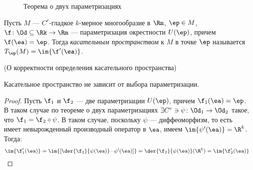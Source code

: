 \begin{figure}[ht]
    \centering
    \caption{Теорема о двух параметризациях}
\end{figure}

\newpage

\begin{definition}

    Пусть $M$ --- $C^r$-гладкое $k$-мерное многообразие в $\Rm$, $\ep \in M$,
    \\ $\f \colon \Od \subseteq \Rk \to \Rm$ --- параметризация окрестности
    $U(\ep)$, причем $\f(\ea) = \ep$. Тогда \textit{касательным
    пространством} к $M$ в точке $\ep$ называется $T_\ep(M) = \im{\f'(\ea)}$.
\end{definition}

\begin{theorem}(О корректности определения касательного пространства)

    Касательное пространство не зависит от выбора параметризации.
\end{theorem}
\begin{proof}
	Пусть $\f_1$ и $\f_2$ --- две параметризации $U(\ep)$, причем $\f_1(\ea) = \ep$.
	В таком случае по
    теореме о двух параметризациях $\exists C^r \ni \psi \colon \Od_1 \to \Od_2$
    такое, что $\f_1 = \f_2 \circ \psi$. В таком случае, поскольку
    $\psi$ --- диффеоморфизм, то есть имеет невырожденный производный оператор
    в $\ea$, имеем $\im{\psi'(\ea)} = \R^k$. Тогда:
\[
	\im{\f'_1(\ea)} = \im{[\der{\f_2}{\psi(\ea)} \cdot \psi'(\ea)]}
	= \der{\f_2}{\psi(\ea)}(\R^k) = \im{\f'_2(\ea)}
\]
\end{proof}

